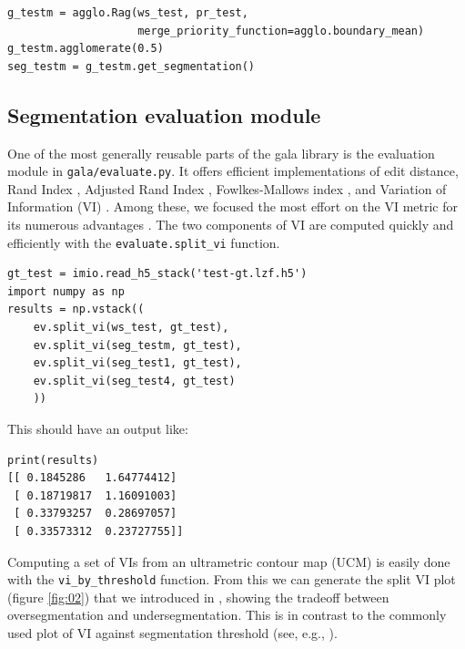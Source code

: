 \documentclass{frontiersSCNS} %
\begin{document}
{\small
\begin{verbatim}
g_testm = agglo.Rag(ws_test, pr_test,
                    merge_priority_function=agglo.boundary_mean)
g_testm.agglomerate(0.5)
seg_testm = g_testm.get_segmentation()
\end{verbatim}
}

\subsection{Segmentation evaluation module}

One of the most generally reusable parts of the gala library is the evaluation module in \texttt{\small gala/evaluate.py}.
It offers efficient implementations of edit distance, Rand Index \citep{Rand:1971uy}, Adjusted Rand Index \citep{Hubert:1985}, Fowlkes-Mallows index \citep{Fowlkes:1983wz}, and Variation of Information (VI) \citep{meila:2005}.
Among these, we focused the most effort on the VI metric for its numerous advantages \citep{meila:2005, NunezIglesias:2013cd}.
The two components of VI are computed quickly and efficiently with the \texttt{\small evaluate.split\_vi} function.

{\small
\begin{verbatim}
gt_test = imio.read_h5_stack('test-gt.lzf.h5')
import numpy as np
results = np.vstack((
    ev.split_vi(ws_test, gt_test),
    ev.split_vi(seg_testm, gt_test),
    ev.split_vi(seg_test1, gt_test),
    ev.split_vi(seg_test4, gt_test)
    ))
\end{verbatim}
}

This should have an output like:

{\small
\begin{verbatim}
print(results)
[[ 0.1845286   1.64774412]
 [ 0.18719817  1.16091003]
 [ 0.33793257  0.28697057]
 [ 0.33573312  0.23727755]]
 \end{verbatim}
}

Computing a set of VIs from an ultrametric contour map (UCM) \citep{Arbelaez:jg} is easily done with the \texttt{\small vi\_by\_threshold} function.
From this we can generate the split VI plot (figure \ref{fig:02}) that we introduced in \cite{NunezIglesias:2013cd}, showing the tradeoff between oversegmentation and undersegmentation.
This is in contrast to the commonly used plot of VI against segmentation threshold (see, e.g., \cite{Andres:2012vp}).
\end{document}
